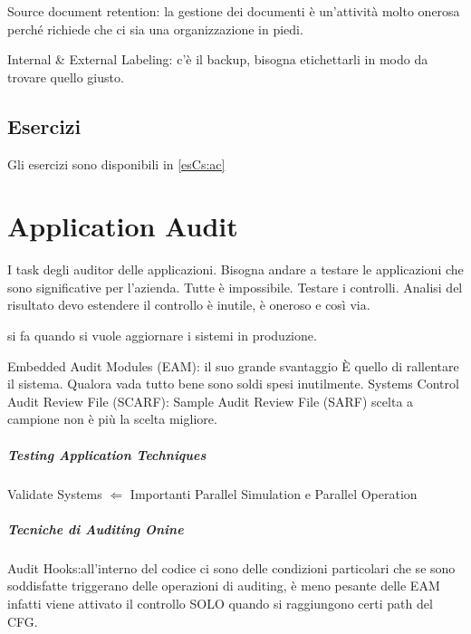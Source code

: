 
Source document retention: la gestione dei documenti è un'attività molto onerosa
perché richiede che ci sia una organizzazione in piedi.

Internal \& External Labeling: c'è il backup, bisogna etichettarli in modo da
trovare quello giusto.

\section{Esercizi}

Gli esercizi sono disponibili in \ref{esCs:ac}

\chapter{Application Audit}
\label{cs:aa}

I task degli auditor delle applicazioni. Bisogna andare a testare le
applicazioni che sono significative per l'azienda. Tutte è impossibile.
Testare i controlli. Analisi del risultato devo estendere il controllo è
inutile, è oneroso e così via.



si fa quando si vuole aggiornare i sistemi in produzione.

Embedded Audit Modules (EAM): il suo grande svantaggio È quello di rallentare il
sistema. Qualora vada tutto bene sono soldi spesi inutilmente.
Systems Control Audit Review File (SCARF):
Sample Audit Review File (SARF) scelta a campione non è più la scelta migliore.

\paragraph{Testing Application Techniques}
Validate Systems $\Leftarrow$ Importanti Parallel Simulation e Parallel
Operation



\paragraph{Tecniche di Auditing Onine}
Audit Hooks:all'interno del codice ci sono delle condizioni particolari che se
sono soddisfatte triggerano delle operazioni di auditing, è meno pesante delle
EAM infatti viene attivato il controllo SOLO quando si raggiungono certi path
del CFG.

